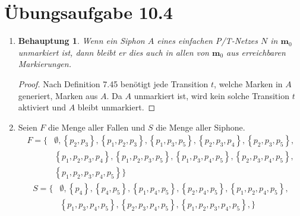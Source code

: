 \documentclass[a4paper]{scrartcl}
\newtheorem*{behaupt}{Behauptung}
\begin{document}
\section*{Übungsaufgabe 10.4} 
\begin{enumerate}
    \item
        \begin{behaupt}
            Wenn ein Siphon $A$ eines einfachen P/T-Netzes $N$ in $\textbf{m}_0$
            unmarkiert ist, dann bleibt er dies auch in allen von $\textbf{m}_0$
            aus erreichbaren Markierungen.
        \end{behaupt}
        \begin{proof}
            Nach Definition 7.45 benötigt jede Transition $t$, welche Marken in
            $A$ generiert, Marken aus $A$.
            Da $A$ unmarkiert ist, wird kein solche Transition $t$ aktiviert und
            $A$ bleibt unmarkiert.
        \end{proof}

    \item
        Seien $F$ die Menge aller Fallen und $S$ die Menge aller Siphone.
        \begin{equation}
            \begin{split}
                F = \Big\{
                    & \emptyset,
                    \left\{ p_2, p_3 \right\},
                    \left\{ p_1, p_2, p_3 \right\},
                    \left\{ p_1, p_3, p_5 \right\},
                    \left\{ p_2, p_3, p_4 \right\},
                    \left\{ p_2, p_3, p_5 \right\}, \\
                    & \left\{ p_1, p_2, p_3, p_4 \right\},
                    \left\{ p_1, p_2, p_3, p_5 \right\},
                    \left\{ p_1, p_3, p_4, p_5 \right\},
                    \left\{ p_2, p_3, p_4, p_5 \right\}, \\
                    & \left\{ p_1, p_2, p_3, p_4, p_5 \right\}
                \Big\}
            \end{split}
        \end{equation}
        \begin{equation}
            \begin{split}
                S = \Big\{
                    & \emptyset,
                    \left\{ p_4 \right\},
                    \left\{ p_4, p_5 \right\},
                    \left\{ p_1, p_4, p_5 \right\},
                    \left\{ p_2, p_4, p_5 \right\},
                    \left\{ p_1, p_2, p_4, p_5 \right\}, \\
                    & \left\{ p_1, p_3, p_4, p_5 \right\},
                    \left\{ p_2, p_3, p_4, p_5 \right\},
                    \left\{ p_1, p_2, p_3, p_4, p_5 \right\},
                \Big\}
            \end{split}
        \end{equation}


\end{enumerate}
\end{document}
